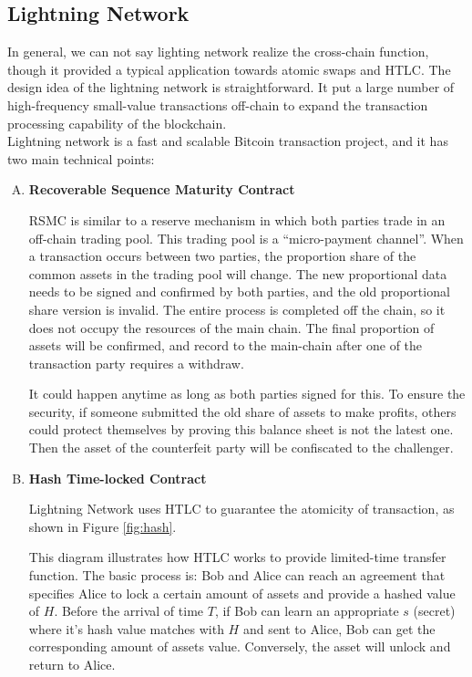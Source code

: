 \subsection{Lightning Network}
\noindent In general, we can not say lighting network realize the cross-chain function, though it provided a typical application towards atomic swaps and HTLC. The design idea of the lightning network is straightforward. It put a large number of high-frequency small-value transactions off-chain to expand the transaction processing capability of the blockchain.\\
\noindent Lightning network\cite{poon2016bitcoin} is a fast and scalable Bitcoin transaction project, and it has two main technical points:
\begin{enumerate}[A.]
    \item \textbf{Recoverable Sequence Maturity Contract} 
    
    	RSMC is similar to a reserve mechanism in which both parties trade in an
    	off-chain trading pool.  This trading pool is a ``micro-payment channel''.
    	When a transaction occurs between two parties, the proportion share of the
    	common assets in the trading pool will change. The new proportional data
    	needs to be signed and confirmed by both parties, and the old proportional
    	share version is invalid. The entire process is completed off the chain,
    	so it does not occupy the resources of the main chain. The final
    	proportion of assets will be confirmed, and record to the main-chain after
    	one of the transaction party requires a withdraw.
    	
    	It could happen anytime as long as both parties signed for this. To ensure
    	the security, if someone submitted the old share of assets to make
    	profits, others could protect themselves by proving this balance sheet is
    	not the latest one. Then the asset of the counterfeit party will be
    	confiscated to the challenger.
    \item \textbf{Hash Time-locked Contract}
    
     Lightning Network uses HTLC to guarantee the atomicity of transaction, as
     shown in Figure \ref{fig:hash}. 
     
     This diagram illustrates how HTLC works to
     provide limited-time transfer function. The basic process is: Bob and Alice
     can reach an agreement that specifies Alice to lock a certain amount of
     assets and provide a hashed value of $H$. Before the arrival of time $T$, if
     Bob can learn an appropriate $s$ (secret) where it's hash value matches with
     $H$ and sent to Alice, Bob can get the corresponding amount of assets value.
     Conversely, the asset will unlock and return to Alice.
\end{enumerate}

